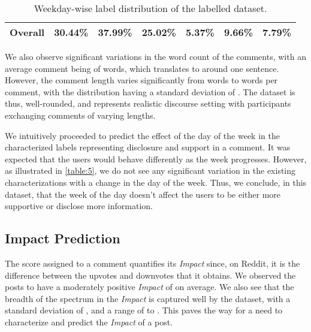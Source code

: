\documentclass[runningheads]{llncs}
\begin{document}
\begin{table}[]
{\begin{tabular}{|l|r|r|r|r|r|r|}
\textbf{Overall}       & \textbf{30.44\%}                                                                             & \textbf{37.99\%}                                                                                 & \textbf{25.02\%}                      & \textbf{5.37\%}                                                                         & \textbf{9.66\%}                                                                               & \textbf{7.79\%}                                \\ \hline
\end{tabular}}
\caption{Weekday-wise label distribution of the labelled dataset.}
\label{table:5}
\end{table}

We also observe significant variations in the word count of the comments, with an average comment being of  words, which translates to around one sentence\cite{SentenceLengthPaper}. However, the comment length varies significantly from  words to  words per comment, with the distribution having a standard deviation of . The dataset is thus, well-rounded, and represents realistic discourse setting with participants exchanging comments of varying lengths.


We intuitively proceeded to predict the effect of the day of the week in the characterized labels representing disclosure and support in a comment. It was expected that the users would behave differently as the week progresses. However,  as illustrated in \autoref{table:5}, we do not see any significant variation in the existing characterizations with a change in the day of the week. Thus, we conclude, in this dataset, that the week of the day doesn’t affect the users to be either more supportive or disclose more information.

\subsection{Impact Prediction}

The score assigned to a comment quantifies its \textit{Impact} since, on Reddit, it is the difference between the upvotes and downvotes that it obtains. We observed the posts to have a moderately positive \textit{Impact} of  on average. We also see that the breadth of the spectrum in the \textit{Impact} is captured well by the dataset, with a standard deviation of , and a range of  to . This paves the way for a need to characterize and predict the \textit{Impact} of a post.
\end{document}
